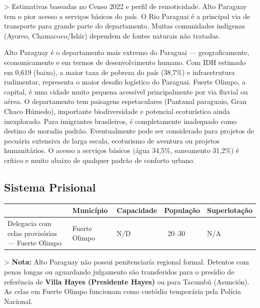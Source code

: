 > Estimativas baseadas no Censo 2022 e perfil de remoticidade. Alto Paraguay tem o pior acesso a serviços básicos do país. O Rio Paraguai é a principal via de transporte para grande parte do departamento. Muitas comunidades indígenas (Ayoreo, Chamacoco/Ishir) dependem de fontes naturais não tratadas.

Alto Paraguay é o departamento mais extremo do Paraguai --- geograficamente, economicamente e em termos de desenvolvimento humano. Com IDH estimado em 0,619 (baixo), a maior taxa de pobreza do país (38,7\%) e infraestrutura rudimentar, representa o maior desafio logístico do Paraguai. Fuerte Olimpo, a capital, é uma cidade muito pequena acessível principalmente por via fluvial ou aérea. O departamento tem paisagens espetaculares (Pantanal paraguaio, Gran Chaco Húmedo), importante biodiversidade e potencial ecoturístico ainda inexplorado. Para imigrantes brasileiros, é completamente inadequado como destino de moradia padrão. Eventualmente pode ser considerado para projetos de pecuária extensiva de larga escala, ecoturismo de aventura ou projetos humanitários. O acesso a serviços básicos (água 34,5\%, saneamento 31,2\%) é crítico e muito abaixo de qualquer padrão de conforto urbano.

\subsection*{Sistema Prisional}

{\small
\setlength{\tabcolsep}{3pt}
\renewcommand{\arraystretch}{1.12}
{\small
{\scriptsize\setlength{\tabcolsep}{2pt}\begin{tabularx}{\linewidth}{lXXXX}}
\toprule
Nome & Município & Capacidade & População & Superlotação \\
\midrule
Delegacia com celas provisórias --- Fuerte Olimpo & Fuerte Olimpo & N/D & ~20--30 & N/A \\
\bottomrule
\end{tabularx}}
}
}

> \textbf{Nota:} Alto Paraguay não possui penitenciaría regional formal. Detentos com penas longas ou aguardando julgamento são transferidos para o presídio de referência de \textbf{Villa Hayes (Presidente Hayes)} ou para Tacumbú (Asunción). As celas em Fuerte Olimpo funcionam como custódia temporária pela Polícia Nacional.

